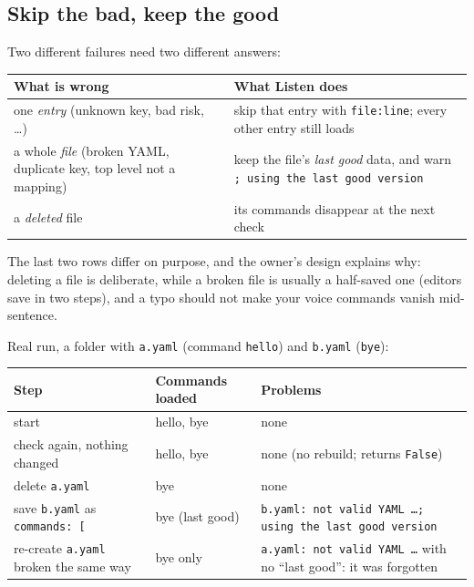 \documentclass[11pt,a4paper]{article}
\begin{document}
\subsection{Skip the bad, keep the good}
Two different failures need two different answers:
\begin{center}
\begin{tabularx}{\textwidth}{p{} X}
\toprule
\textbf{What is wrong} & \textbf{What Listen does} \\
\midrule
one \emph{entry} (unknown key, bad risk, \ldots) & skip that entry with
   \texttt{file:line}; every other entry still loads \\
a whole \emph{file} (broken YAML, duplicate key, top level not a mapping) & keep the file's
   \emph{last good} data, and warn \texttt{; using the last good version} \\
a \emph{deleted} file & its commands disappear at the next check \\
\bottomrule
\end{tabularx}
\end{center}
\noindent The last two rows differ on purpose, and the owner's design explains why: deleting a
file is deliberate, while a broken file is usually a half-saved one (editors save in two steps),
and a typo should not make your voice commands vanish mid-sentence.

Real run, a folder with \texttt{a.yaml} (command \texttt{hello}) and \texttt{b.yaml}
(\texttt{bye}):
\begin{center}
\begin{tabularx}{\textwidth}{p{} p{} X}
\toprule
\textbf{Step} & \textbf{Commands loaded} & \textbf{Problems} \\
\midrule
start & hello, bye & none \\
check again, nothing changed & hello, bye & none (no rebuild; returns \texttt{False}) \\
delete \texttt{a.yaml} & bye & none \\
save \texttt{b.yaml} as \texttt{commands: [} & bye (last good) & \texttt{b.yaml: not valid YAML
  \ldots{}; using the last good version} \\
re-create \texttt{a.yaml} broken the same way & bye only & \texttt{a.yaml: not valid YAML
  \ldots{}} with no ``last good'': it was forgotten \\
\bottomrule
\end{tabularx}
\end{center}
\end{document}
